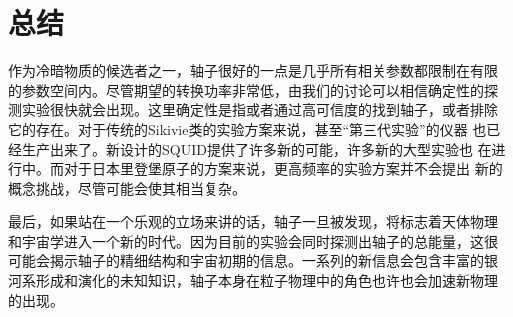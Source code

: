 \documentclass[twocolumn,12pt,a4paper]{article}
\begin{document}
\section{总结}
作为冷暗物质的候选者之一，轴子很好的一点是几乎所有相关参数都限制在有限
的参数空间内。尽管期望的转换功率非常低，由我们的讨论可以相信确定性的探
测实验很快就会出现。这里确定性是指或者通过高可信度的找到轴子，或者排除
它的存在。对于传统的Sikivie类的实验方案来说，甚至``第三代实验''的仪器
也已经生产出来了。新设计的SQUID提供了许多新的可能，许多新的大型实验也
在进行中。而对于日本里登堡原子的方案来说，更高频率的实验方案并不会提出
新的概念挑战，尽管可能会使其相当复杂。\par
最后，如果站在一个乐观的立场来讲的话，轴子一旦被发现，将标志着天体物理
和宇宙学进入一个新的时代。因为目前的实验会同时探测出轴子的总能量，这很
可能会揭示轴子的精细结构和宇宙初期的信息。一系列的新信息会包含丰富的银
河系形成和演化的未知知识，轴子本身在粒子物理中的角色也许也会加速新物理
的出现。
\medskip
\balance
\renewcommand{\refname}{参考文献}
\printbibliography
\end{document}
